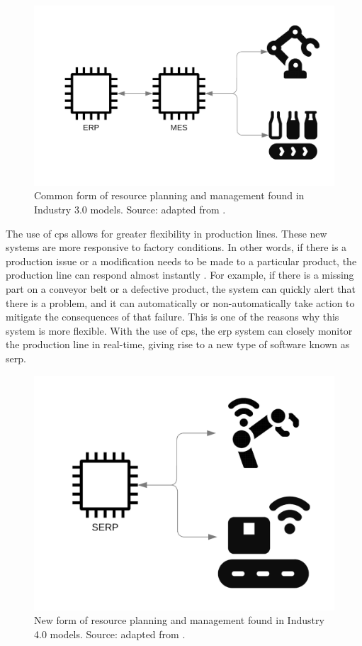 \begin{figure}[ht!]
    \centering
    \includegraphics[scale=0.2]{images/Related/ERP.png}
    \caption{Common form of resource planning and management found in Industry 3.0 models. Source: adapted from \cite{Gilchrist2016}.}

    \label{fig:erp}
\end{figure}


The use of \acrfull{cps} allows for greater flexibility in production lines. These new systems are more responsive to factory conditions. In other words, if there is a production issue or a modification needs to be made to a particular product, the production line can respond almost instantly \cite{Gilchrist2016}. For example, if there is a missing part on a conveyor belt or a defective product, the system can quickly alert that there is a problem, and it can automatically or non-automatically take action to mitigate the consequences of that failure. This is one of the reasons why this system is more flexible. With the use of \acrfull{cps}, the \acrfull{erp} system can closely monitor the production line in real-time, giving rise to a new type of software known as \acrfull{serp}.

\begin{figure}[ht!]
    \centering
    \includegraphics[scale=0.2]{images/Related/SERP.png}
    \caption{New form of resource planning and management found in Industry 4.0 models. Source: adapted from \cite{Gilchrist2016}.}

    \label{fig:serp}
\end{figure}

